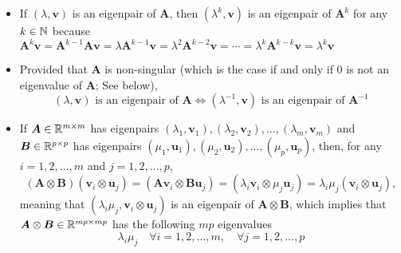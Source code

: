 \documentclass[12pt,a4paper]{article}
\begin{document}
\begin{itemize}
\begin{itemize}
\begin{itemize}
    \item If $(\lambda, \bm{v})$ is an eigenpair of $\bm{A}$,
      then $(\lambda^{k}, \bm{v})$ is an eigenpair of $\bm{A}^{k}$ for any $k\in \mathbb{N}$
      because
      $\bm{A}^{k}\bm{v} = \bm{A}^{k-1}\bm{A}\bm{v}  = \lambda\bm{A}^{k-1}\bm{v} = \lambda^{2}\bm{A}^{k-2}\bm{v} = \cdots = \lambda^{k}\bm{A}^{k-k}\bm{v} = \lambda^{k}\bm{v}$
    \item Provided that $\bm{A}$ is non-singular (which is the case if and only if $0$ is not an eigenvalue of $\bm{A}$; See below),
      \begin{equation}\nonumber%
        \text{$(\lambda,\bm{v})$ is an eigenpair of $\bm{A}$}
        \iff
        \text{$(\lambda^{-1}, \bm{v})$ is an eigenpair of $\bm{A}^{-1}$}
      \end{equation}

  \item If $\bm{A}\in \mathbb{R}^{m\times m}$ has eigenpairs $(\lambda_{1},\bm{v}_{1}),(\lambda_{2},\bm{v}_{2}),\ldots,(\lambda_{m},\bm{v}_{m})$
      and $\bm{B}\in \mathbb{R}^{p\times p}$ has eigenpairs $(\mu_{1},\bm{u}_{1}),(\mu_{2},\bm{u}_{2}),\ldots,(\mu_{p},\bm{u}_{p})$,
      then, for any $i=1,2, \ldots, m$ and $j=1,2, \ldots, p$,
      \begin{equation}\nonumber%
        (\bm{A}\otimes \bm{B}) (\bm{v}_{i}\otimes \bm{u}_{j})
        =
        (\bm{A}\bm{v}_{i}\otimes \bm{B}\bm{u}_{j})
        =
        (\lambda_{i}\bm{v}_{i}\otimes \mu_{j}\bm{u}_{j})
        =
        \lambda_{i}\mu_{j} (\bm{v}_{i}\otimes \bm{u}_{j}),
      \end{equation}
      meaning that $(\lambda_{i}\mu_{j}, \bm{v}_{i}\otimes \bm{u}_{j})$ is an eigenpair of $\bm{A}\otimes \bm{B}$,
      which implies that $\bm{A}\otimes \bm{B}\in \mathbb{R}^{mp\times mp}$ has the following $mp$ eigenvalues
      \begin{equation}\nonumber%
        \lambda_{i}\mu_{j} \quad \forall i = 1, 2, \ldots, m, \quad \forall j= 1,2, \ldots, p
      \end{equation}
    \end{itemize}
  \end{itemize}


\end{itemize}
\end{document}

